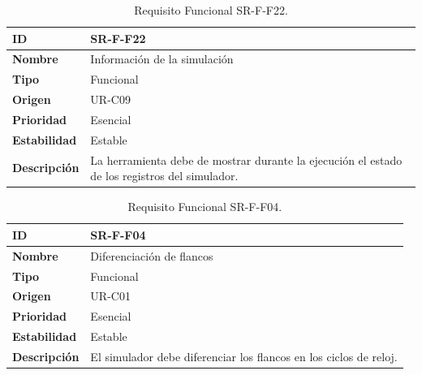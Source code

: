\begin{center}
\begin{table}[htbp]
\centering
\begin{tabular}{@{}p{2.5cm} p{9cm}@{}} 
\toprule
\textbf{ID} 				& SR-F-F22\\
\midrule
\textbf{Nombre} 			& Información de la simulación\\
\midrule
\textbf{Tipo} 			& Funcional \\
\midrule
\textbf{Origen} 			& UR-C09 \\
\midrule
\textbf{Prioridad}		& Esencial \\
\midrule
\textbf{Estabilidad} 		& Estable \\
\midrule
\textbf{Descripción} 	& La herramienta debe de mostrar durante la ejecución el estado de los registros del simulador. \\
\bottomrule
\end{tabular}
\caption{Requisito Funcional SR-F-F22.}
\label{tab:srff22}
\end{table}
\end{center}





\iffalse

\begin{center}
\begin{table}[htbp]
\centering
\begin{tabular}{@{}p{2.5cm} p{9cm}@{}} 
\toprule
\textbf{ID} 				& SR-F-F04 \\
\midrule
\textbf{Nombre} 			& Diferenciación de flancos \\
\midrule
\textbf{Tipo} 			& Funcional \\
\midrule
\textbf{Origen} 			& UR-C01 \\
\midrule
\textbf{Prioridad}		& Esencial \\
\midrule
\textbf{Estabilidad} 		& Estable \\
\midrule
\textbf{Descripción} 	& El simulador debe diferenciar los flancos en los ciclos de reloj. \\
\bottomrule
\end{tabular}
\caption{Requisito Funcional SR-F-F04.}
\label{tab:srff00}
\end{table}
\end{center}

